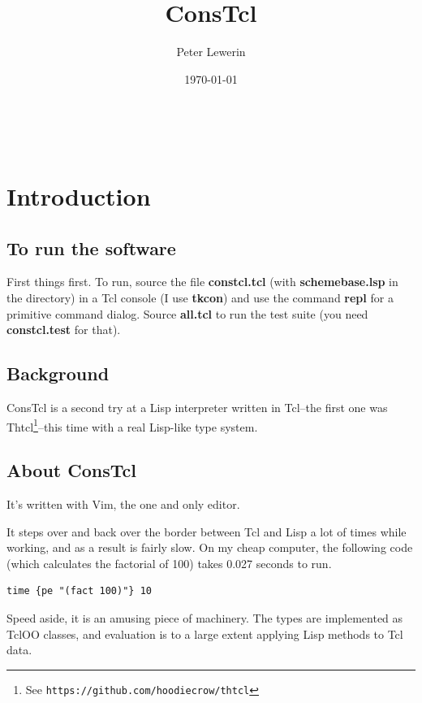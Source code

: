 \documentclass[twoside,9pt]{report}
\title{ConsTcl}
\author{Peter Lewerin}
\date{\today}
\begin{document}
\pagestyle{headings}
\maketitle
\tableofcontents
 
\chapter{Introduction}
\label{introduction}
\section{To run the software}
\label{to-run-the-software}

First things first. To run, source the file \textbf{constcl.tcl} (with \textbf{schemebase.lsp} in the directory) in a Tcl console (I use \textbf{tkcon}) and use the command \textbf{repl} for a primitive command dialog. Source \textbf{all.tcl} to run the test suite (you need \textbf{constcl.test} for that).

\section{Background}
\label{background}

ConsTcl is a second try at a Lisp interpreter written in Tcl--the first one was Thtcl\footnote{See \texttt{https://github.com/hoodiecrow/thtcl}}--this time with a real Lisp-like type system.

\section{About ConsTcl}
\label{about-constcl}

It's written with Vim, the one and only editor.


It steps over and back over the border between Tcl and Lisp a lot of times while working, and as a result is fairly slow. On my cheap computer, the following code (which calculates the factorial of 100) takes 0.027 seconds to run.

\noindent\makebox[\linewidth]{\rule{\linewidth}{0.4pt}}
\begin{lstlisting}
time {pe "(fact 100)"} 10
\end{lstlisting}
\noindent\makebox[\linewidth]{\rule{\linewidth}{0.4pt}}

Speed aside, it is an amusing piece of machinery. The types are implemented as TclOO classes, and evaluation is to a large extent applying Lisp methods to Tcl data.
\end{document}
